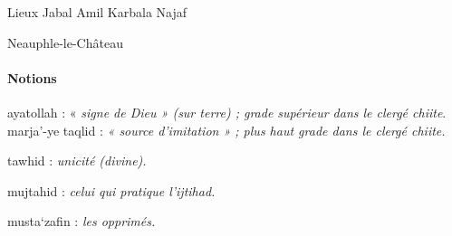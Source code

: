 {Lieux} Jabal Amil Karbala Najaf

Neauphle-le-Château

\paragraph{Notions}

ayatollah : « \emph{signe de Dieu » (sur terre) ; grade supérieur dans
le clergé chiite}. marja'-ye taqlid : \emph{« source d'imitation » ;
plus haut grade dans le clergé chiite.} 



tawhid : \emph{unicité (divine).}

mujtahid : \emph{celui qui pratique l'ijtihad.}

musta`zafin : \emph{les opprimés.}


